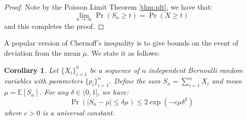 \documentclass{article}
\newtheorem{corollary}{Corollary}[subsection]
\theoremstyle{remark}
\newcommand{\Exp}{\mathbb{E}}
\begin{document}
\begin{proof}
Note by the Poisson Limit Theorem \ref{thm:plt}, we have that:
\begin{equation*}
\lim_{n \to \infty} \Pr(S_{n} \geq t) = \Pr(X \geq t)
\end{equation*}
and this completes the proof.
\end{proof}

A popular version of Chernoff's inequality is to give bounds on the event of deviation from the mean \(\mu\). We state it as follows:
\begin{corollary}
Let \(\{X_{i}\}_{i=1}^{n}\) be a sequence of \(n\) independent Bernoulli random variables with parameters \(\{p_{i}\}_{i=1}^{n}\). Define the sum \(S_{n} = \sum\limits_{i=1}^{n} X_{i}\) and mean \(\mu = \Exp\left[S_{n}\right]\). For any \(\delta \in (0, 1]\), we have:
\begin{equation*}
\Pr\left(\left|S_{n} - \mu\right|\leq \delta\mu\right) \leq 2\exp\left(-c \mu \delta^{2}\right)
\end{equation*}
where \(c > 0\) is a universal constant.
\end{corollary}
\end{document}
